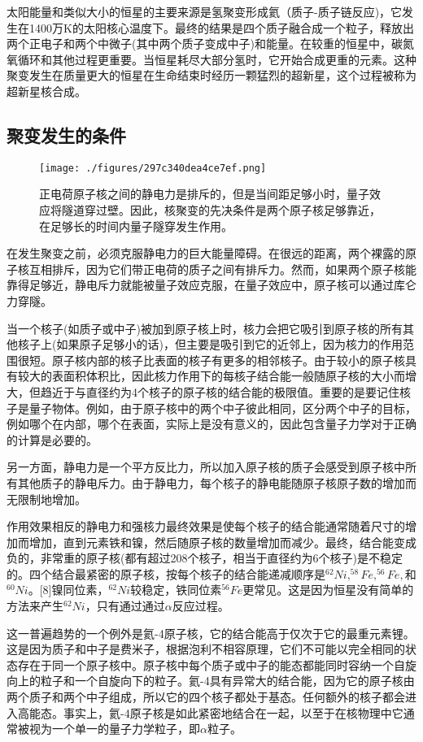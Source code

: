 太阳能量和类似大小的恒星的主要来源是氢聚变形成氦（质子-质子链反应)，它发生在1400万K的太阳核心温度下。最终的结果是四个质子融合成一个粒子，释放出两个正电子和两个中微子(其中两个质子变成中子)和能量。在较重的恒星中，碳氮氧循环和其他过程更重要。当恒星耗尽大部分氢时，它开始合成更重的元素。这种聚变发生在质量更大的恒星在生命结束时经历一颗猛烈的超新星，这个过程被称为超新星核合成。

\subsection{聚变发生的条件}
\begin{figure}[ht]
\centering
\texttt{[image: ./figures/297c340dea4ce7ef.png]}
\caption{正电荷原子核之间的静电力是排斥的，但是当间距足够小时，量子效应将隧道穿过壁。因此，核聚变的先决条件是两个原子核足够靠近，在足够长的时间内量子隧穿发生作用。} \label{fig_HJB_4}
\end{figure}

在发生聚变之前，必须克服静电力的巨大能量障碍。在很远的距离，两个裸露的原子核互相排斥，因为它们带正电荷的质子之间有排斥力。然而，如果两个原子核能靠得足够近，静电斥力就能被量子效应克服，在量子效应中，原子核可以通过库仑力穿隧。

当一个核子(如质子或中子)被加到原子核上时，核力会把它吸引到原子核的所有其他核子上(如果原子足够小的话)，但主要是吸引到它的近邻上，因为核力的作用范围很短。原子核内部的核子比表面的核子有更多的相邻核子。由于较小的原子核具有较大的表面积体积比，因此核力作用下的每核子结合能一般随原子核的大小而增大，但趋近于与直径约为4个核子的原子核的结合能的极限值。重要的是要记住核子是量子物体。例如，由于原子核中的两个中子彼此相同，区分两个中子的目标，例如哪个在内部，哪个在表面，实际上是没有意义的，因此包含量子力学对于正确的计算是必要的。

另一方面，静电力是一个平方反比力，所以加入原子核的质子会感受到原子核中所有其他质子的静电斥力。由于静电力，每个核子的静电能随原子核原子数的增加而无限制地增加。

作用效果相反的静电力和强核力最终效果是使每个核子的结合能通常随着尺寸的增加而增加，直到元素铁和镍，然后随原子核的数量增加而减少。最终，结合能变成负的，非常重的原子核(都有超过208个核子，相当于直径约为6个核子)是不稳定的。四个结合最紧密的原子核，按每个核子的结合能递减顺序是$^{62}Ni,^{58}Fe,^{56}Fe,$和$^{60}Ni$。[8]镍同位素，$^{62}Ni$较稳定，铁同位素$^{56}Fe$更常见。这是因为恒星没有简单的方法来产生$^{62}Ni$，只有通过通过$\alpha$反应过程。

这一普遍趋势的一个例外是氦-4原子核，它的结合能高于仅次于它的最重元素锂。这是因为质子和中子是费米子，根据泡利不相容原理，它们不可能以完全相同的状态存在于同一个原子核中。原子核中每个质子或中子的能态都能同时容纳一个自旋向上的粒子和一个自旋向下的粒子。氦-4具有异常大的结合能，因为它的原子核由两个质子和两个中子组成，所以它的四个核子都处于基态。任何额外的核子都会进入高能态。事实上，氦-4原子核是如此紧密地结合在一起，以至于在核物理中它通常被视为一个单一的量子力学粒子，即$\alpha$粒子。

